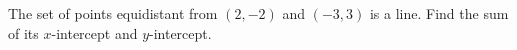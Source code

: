 The set of points equidistant from $(2,-2)$ and $(-3,3)$ is a line. Find the sum of its $ x $-intercept and $ y $-intercept.
